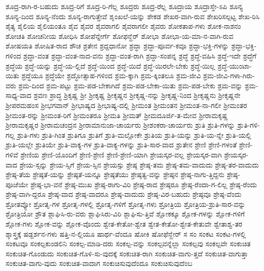 {ಶೂದ್ರ-ರಾಗಿ-ರ-ಬಹುದು
ಶೂದ್ರ-ರಿಗೆ
ಶೂದ್ರ-ರಿ-ಗೆಲ್ಲ
ಶೂದ್ರರು
ಶೂದ್ರ-ರೆಲ್ಲ
ಶೂದ್ರಾಯ
ಶೂದ್ರಾಸ್ತೇ-ಽಪಿ
ಶೂನ್ಯ
ಶೂನ್ಯ-ದಿಂದ
ಶೂನ್ಯ-ನೆಂದು
ಶೂನ್ಯ-ರಾಗುತ್ತೇವೆ
ಶೃಂಖಲೆ-ಯನ್ನು
ಶೇಕಡ
ಶೇಖರ-ವಾಗಿ-ರುವ
ಶೇಖರಿಸಲ್ಪಟ್ಟ
ಶೇಖ-ರಿಸಿ
ಶೈತ್ಯ
ಶೈಲಿಯ
ಶೈಲಿಯಂತೂ
ಶೈವ
ಶೈವರ
ಶೈವರಾಗಲಿ
ಶೈವರಾಗಲೀ
ಶೈವರು
ಶೋಕತಾಪ-ಗಳು
ಶೋಕ-ನಾಶನಂ
ಶೋಚತಿ
ಶೋಚನೀಯ
ಶೋಧಿಸಿ
ಶೋಪೆನ್ನೇರ್ಗೆ
ಶೋಫನ್ಹೆರ್
ಶೋಭಾ
ಶೋಭಾ-ಯ-ಮಾ-ನ-ವಾಗಿ-ರುವ
ಶೋಷಯತಿ
ಶೋಷಿತ-ರಾದ
ಶೌಚ
ಶ್ರತೇನ
ಶ್ರದ್ದಧಾನೋ
ಶ್ರದ್ಧಾ
ಶ್ರದ್ಧಾ-ಪೂರ್ವ-ಕವೂ
ಶ್ರದ್ಧಾ-ಭಕ್ತಿ-ಗಳನ್ನು
ಶ್ರದ್ಧಾ-ಭಕ್ತಿ-ಗಳಿಂದ
ಶ್ರದ್ಧಾ-ವಂತ
ಶ್ರದ್ಧಾ-ವಂತ-ನಾದ-ವನು
ಶ್ರದ್ಧಾ-ವಂತ-ರಾಗಿ
ಶ್ರದ್ಧಾ-ಸಂಪನ್ನ
ಶ್ರದ್ಧೆ
ಶ್ರದ್ಧೆ-ವಹಿಸಿ
ಶ್ರದ್ಧೆ-ಇದೇ
ಶ್ರದ್ಧೆಗೆ
ಶ್ರದ್ಧೆಯ
ಶ್ರದ್ಧೆ-ಯನ್ನು
ಶ್ರದ್ಧೆ-ಯ-ಲ್ಲಿದೆ
ಶ್ರದ್ಧೆ-ಯಿಂದ
ಶ್ರದ್ಧೆ-ಯಿದೆ
ಶ್ರದ್ಧೆ-ಯಿರಲೇ-ಬೇಕು
ಶ್ರದ್ಧೆ-ಯಿಲ್ಲ
ಶ್ರದ್ಧೆ-ಯುಂಟಾ-ಯಿತು
ಶ್ರದ್ಧೆಯೂ
ಶ್ರದ್ಧೆಯೇ
ಶ್ರದ್ಧೋತ್ಸಾಹ-ಗಳಿಂದ
ಶ್ರಮ-ಕ್ಕಾಗಿ
ಶ್ರಮ-ಕ್ಕಿಂತಲೂ
ಶ್ರಮ-ಜೀವಿ
ಶ್ರಮ-ಜೀವಿ-ಗಳಾ-ಗಿರು-ವರು
ಶ್ರಮ-ದಿಂದ
ಶ್ರಮ-ಪಟ್ಟು
ಶ್ರಮ-ಪಡ-ಬೇಕಾಗಿದೆ
ಶ್ರಮ-ಪಡ-ಬೇಕಾ-ಯಿತು
ಶ್ರಮ-ಪಡ-ಬೇಕು
ಶ್ರಮ-ವನ್ನು
ಶ್ರಮ-ಸಾಧ್ಯ-ವಾದ
ಶ್ರವಣ
ಶ್ರಾದ್ಧ
ಶ್ರಿಕೃಷ್ಣ
ಶ್ರೀ
ಶ್ರೀಕೃಷ್ಣ
ಶ್ರೀಕೃಷ್ಣನ
ಶ್ರೀಕೃಷ್ಣ-ನನ್ನು
ಶ್ರೀಕೃಷ್ಣ-ನಿಂದ
ಶ್ರೀಕೃಷ್ಣನು
ಶ್ರೀಕೃಷ್ಣನೇ
ಶ್ರೀಪರಮಹಂಸ
ಶ್ರೀಭಗವಾನ್
ಶ್ರೀಭಾಷ್ಯದ
ಶ್ರೀಭಾಷ್ಯ-ದಲ್ಲಿ
ಶ್ರೀಮಂತ
ಶ್ರೀಮಂತನ
ಶ್ರೀಮಂತ-ನಾ-ಗಲೀ
ಶ್ರೀಮಂತರ
ಶ್ರೀಮಂತ-ರನ್ನು
ಶ್ರೀಮಂತ-ರಿಗೆ
ಶ್ರೀಮಂತರೂ
ಶ್ರೀಮತಿ
ಶ್ರೀಮತ್
ಶ್ರೀಮದೂರ್ಜಿ-ತ-ಮೇವ
ಶ್ರೀರಾಮಕೃಷ್ಣ
ಶ್ರೀರಾಮಕೃಷ್ಣರ
ಶ್ರೀರಾಮಚಂದ್ರನ
ಶ್ರೀರಾಮಾನುಜಾ-ಚಾರ್ಯರು
ಶ್ರೀಶಂಕರಾ-ಚಾರ್ಯರು
ಶ್ರುತಿ
ಶ್ರುತಿ-ಗಳನ್ನು
ಶ್ರುತಿ-ಗಳಿ-ಗಲ್ಲ
ಶ್ರುತಿ-ಗಳು
ಶ್ರುತಿ-ಗಿಂತ
ಶ್ರುತಿಗೂ
ಶ್ರುತಿಗೆ
ಶ್ರುತಿ-ಮಲ್ಲೋಕೇ
ಶ್ರುತಿಯ
ಶ್ರುತಿ-ಯನ್ನು
ಶ್ರುತಿ-ಯ-ನ್ನೇ
ಶ್ರುತಿ-ಯಲ್ಲಿ
ಶ್ರುತಿ-ಯಲ್ಲೇ
ಶ್ರುತಿಯೇ
ಶ್ರುತಿ-ವಾಕ್ಯ-ಗಳ
ಶ್ರುತಿ-ವಾಕ್ಯ-ಗಳನ್ನು
ಶ್ರುತಿ-ಸಾರ-ವಾದ
ಶ್ರುತೇನ
ಶ್ರೇಣಿ
ಶ್ರೇಣಿ-ಗಳಂತೆ
ಶ್ರೇಣಿ-ಗಳಿವೆ
ಶ್ರೇಣಿಯ
ಶ್ರೇಣಿ-ಯೊಂದಿಗೆ
ಶ್ರೇಣಿ-ಶ್ರೇಣಿ
ಶ್ರೇಣಿ-ಶ್ರೇಣಿ-ಯಾಗಿ
ಶ್ರೇಯಸ್ಕರ-ವಲ್ಲ
ಶ್ರೇಯಸ್ಕರ-ವಾಗಿ
ಶ್ರೇಯಸ್ಕರ-ವಾದ
ಶ್ರೇಯ-ಸ್ಸನ್ನು
ಶ್ರೇಯ-ಸ್ಸಿಗೆ
ಶ್ರೇಯ-ಸ್ಸಿನ
ಶ್ರೇಯಸ್ಸು
ಶ್ರೇಷ್ಠ
ಶ್ರೇಷ್ಠ-ತಮ
ಶ್ರೇಷ್ಠ-ತಮ-ವಾದುದು
ಶ್ರೇಷ್ಠ-ತರ-ವಾದುದು
ಶ್ರೇಷ್ಠ-ತೆಯ
ಶ್ರೇಷ್ಠತೆ-ಯನ್ನು
ಶ್ರೇಷ್ಠತೆ-ಯನ್ನೂ
ಶ್ರೇಷ್ಠತೆಯು
ಶ್ರೇಷ್ಠತ್ವ-ವನ್ನು
ಶ್ರೇಷ್ಠನ
ಶ್ರೇಷ್ಠ-ನಾಗು-ತ್ತಿದ್ದನು
ಶ್ರೇಷ್ಠ-ಪೂಜೆಯೇ
ಶ್ರೇಷ್ಠ-ಭಾ-ವನೆ
ಶ್ರೇಷ್ಠ-ಮುಖ
ಶ್ರೇಷ್ಠ-ರಾಗು-ವಿರಿ
ಶ್ರೇಷ್ಠ-ರಾದ
ಶ್ರೇಷ್ಠರೂ
ಶ್ರೇಷ್ಠ-ರೆಂದಾ-ಗ-ಲಿಲ್ಲ
ಶ್ರೇಷ್ಠ-ರೆಂದು
ಶ್ರೇಷ್ಠ-ವಾಗಿ-ದ್ದರೂ
ಶ್ರೇಷ್ಠ-ವಾದ
ಶ್ರೇಷ್ಠ-ವಾದರೂ
ಶ್ರೇಷ್ಠ-ವಾದುದು
ಶ್ರೇಷ್ಠ-ವಿರ-ಬಹುದು
ಶ್ರೇಷ್ಠವೂ
ಶ್ರೇಷ್ಠ-ವೆಂದು
ಶ್ರೋತವ್ಯೋ
ಶ್ರೋತೃ-ಗಳ
ಶ್ರೋತೃ-ಗಳಲ್ಲಿ
ಶ್ರೋತೃ-ಗಳಿಗೆ
ಶ್ರೋತೃ-ಗಳು
ಶ್ರೋತ್ರಿಯ
ಶ್ರೋತ್ರಿಯ-ಶ್ರುತಿ-ಸಾರ-ವನ್ನು
ಶ್ರೋತ್ರಿಯೋ
ಶ್ರೌತ
ಶ್ಲಾಘಿಸಿ-ರು-ವರು
ಶ್ಲಾಘಿಸಿರು-ವಿರಿ
ಶ್ಲಾಘಿಸು-ತ್ತಿವೆ
ಶ್ಲೋಕಕ್ಕೂ
ಶ್ಲೋಕ-ಗಳನ್ನು
ಶ್ಲೋಕ-ಗಳಿಗೆ
ಶ್ಲೋಕ-ಗಳು
ಶ್ಲೋಕ-ವನ್ನು
ಶ್ಲೋಕ-ವೊಂದು
ಶ್ವೇತ-ಕೇತೋ-ಶ್ವೇತ
ಶ್ವೇತ-ಕೇತೋ-ಶ್ವೇತ-ಕೇತುವೇ
ಶ್ವೇತಾಶ್ವ-ತರ
ಶ್ಶಾಸ್ತ್ರಕ್ಕೆ
ಷಡ್ದರ್ಶನ-ಗಳು
ಷತ್ತಿ-ನ-ಲ್ಲಿಯೂ
ಷಾರ್ಥ-ವೆಂದೂ
ಷೋಕಿ
ಷೋಫೆನ್ಹೇರ್
ಸ
ಸಂ
ಸಂಕಟ
ಸಂಕಟ-ಗಳಲ್ಲಿ
ಸಂಕಟವೂ
ಸಂಕಲ್ಪಕುಂಡಲಿನಿ
ಸಂಕಲ್ಪ-ಮಾಡಿ-ದರು
ಸಂಕಲ್ಪ-ವನ್ನು
ಸಂಕಲ್ಪವನ್ನೆಲ್ಲಾ
ಸಂಕಲ್ಪವು
ಸಂಕಲ್ಪವೇ
ಸಂಕುಚಿತ
ಸಂಕುಚಿತ-ಗೊಂಡುದು
ಸಂಕುಚಿತ-ಗೊಳಿ-ಸು-ವುದಕ್ಕೆ
ಸಂಕುಚಿತ-ರಾಗಿ
ಸಂಕುಚಿತ-ವಾಗು-ತ್ತದೆ
ಸಂಕುಚಿತ-ವಾಗುತ್ತಾ
ಸಂಕುಚಿತ-ವಾಗು-ವುದು
ಸಂಕುಚಿತ-ವಾದಾಗ
ಸಂಕುಚಿಸುವುದೆಂದೂ
ಸಂಕುಚಿಸುವುದೆಂಬ
}
